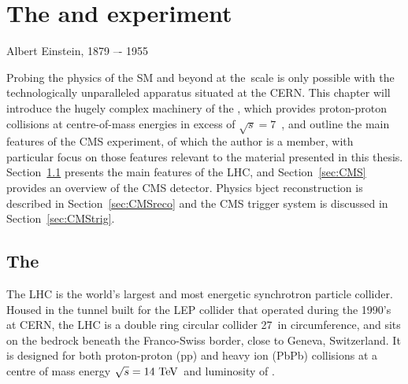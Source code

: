 
\chapter{The \LHC and \CMS experiment}
\label{chap:detector}

{Albert Einstein, 1879 –- 1955}

Probing the physics of the \ac{SM} and beyond at the~\TeV scale is only possible with the technologically unparalleled apparatus situated at the \ac{CERN}.
This chapter will introduce the hugely complex machinery of the \LHC, 
which provides proton-proton collisions at centre-of-mass energies in excess of $\sqrt{s}=7$~\TeV, 
and outline the main features of the \ac{CMS} experiment, of which the author is a member, 
with particular focus on those features relevant to the material presented in this thesis.
%
Section~\ref{sec:LHC} presents the main features of the \ac{LHC}, and Section~\ref{sec:CMS} provides an overview of the \ac{CMS} detector. Physics bject reconstruction is described in Section~\ref{sec:CMSreco} and the \ac{CMS} trigger system is discussed in Section~\ref{sec:CMStrig}. 

%                                                                  

\section{The \LHC}
\label{sec:LHC}
The \ac{LHC} is the world's largest and most energetic synchrotron particle collider. 
Housed in the tunnel built for the \ac{LEP} collider that operated during the 1990's at \ac{CERN}, 
the \ac{LHC} is a double ring circular collider 27~\km in circumference, 
and sits on the bedrock beneath the Franco-Swiss border, close to Geneva, Switzerland. 
It is designed for both proton-proton (pp) and heavy ion (PbPb) collisions at a centre of mass energy $\sqrt{s} = 14~\mathrm{TeV}\,$ and luminosity of \designLumi.


